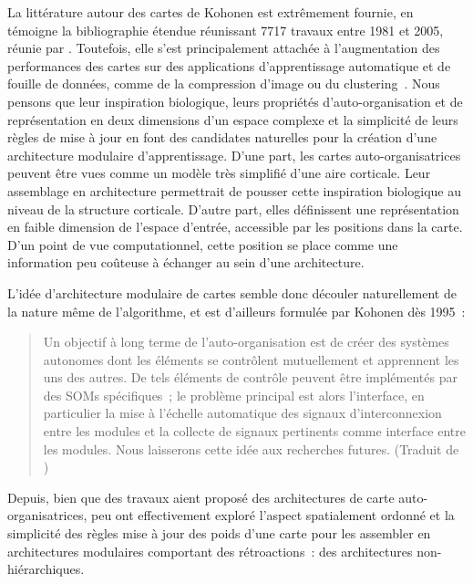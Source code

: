 La littérature autour des cartes de Kohonen est extrêmement fournie, en témoigne la bibliographie étendue réunissant 7717 travaux entre 1981 et 2005, réunie par \cite{Kaski1998BibliographyOS,oja_bibliography_2002,Honkela2009BIBLIOGRAPHYOS}.
Toutefois, elle s'est principalement attachée à l'augmentation des performances des cartes sur des applications d'apprentissage automatique et de fouille de données, comme de la compression d'image ou du clustering~\parencite{kohonen_essentials_2013}.
Nous pensons que leur inspiration biologique, leurs propriétés d'auto-organisation et de représentation en deux dimensions d'un espace complexe et la simplicité de leurs règles de mise à jour en font des candidates naturelles pour la création d'une architecture modulaire d'apprentissage.
D'une part, les cartes auto-organisatrices peuvent être vues comme un modèle très simplifié d'une aire corticale. Leur assemblage en architecture permettrait de pousser cette inspiration biologique au niveau de la structure corticale.
D'autre part, elles définissent une représentation en faible dimension de l'espace d'entrée, accessible par les positions dans la carte.
D'un point de vue computationnel, cette position se place comme une information peu coûteuse à échanger au sein d'une architecture.

L'idée d'architecture modulaire de cartes semble donc découler naturellement de la nature même de l'algorithme, et est d'ailleurs formulée par Kohonen dès 1995~:
\begin{quote}
\og Un objectif à long terme de l'auto-organisation est de créer des systèmes autonomes dont les éléments se contrôlent mutuellement et apprennent les uns des autres. De tels éléments de contrôle peuvent être implémentés par des SOMs spécifiques~; le problème principal est alors l'interface, en particulier la mise à l'échelle automatique des signaux d'interconnexion entre les modules et la collecte de signaux pertinents comme interface entre les modules. Nous laisserons cette idée aux recherches futures. \fg{}
(Traduit de \cite{Kohonen1995SelfOrganizingM})
\end{quote}

Depuis, bien que des travaux aient proposé des architectures de carte auto-organisatrices, peu ont effectivement exploré l'aspect spatialement ordonné et la simplicité des règles mise à jour des poids d'une carte pour les assembler en architectures modulaires comportant des rétroactions~: des architectures non-hiérarchiques.


